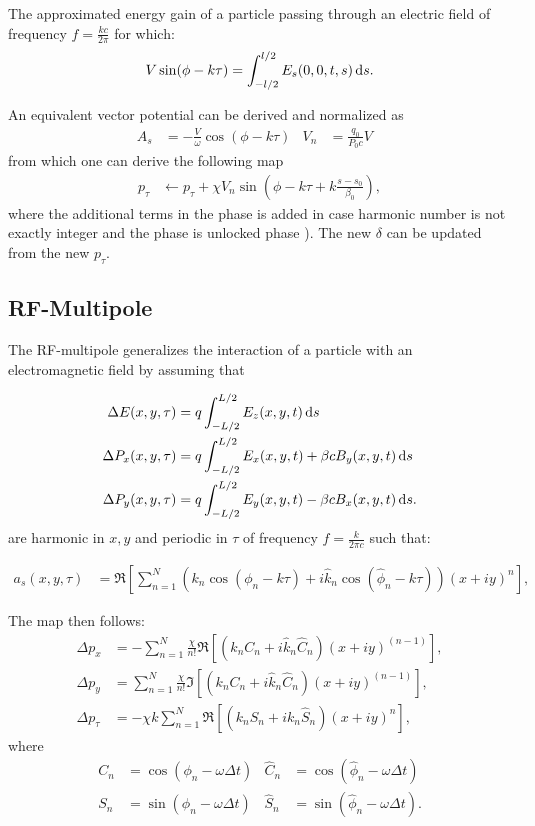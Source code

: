 The approximated energy gain of a particle passing through an electric field of frequency $f=\frac{kc}{2\pi}$ for which:
\begin{align}
V \sin(\phi - k \tau) = \int_{-l/2}^{l/2} E_s(0,0,t,s)  {\rm \,d}s.
\end{align}

An equivalent vector potential can be derived and normalized as
\begin{align}
A_s& = - \frac{V}{\omega} \cos(\phi - k \tau ) & 
V_n&=  \frac{q_0}{P_0 c} V  & 
\end{align}
from which one can derive the following map
\begin{align}
p_\tau & \leftarrow p_\tau + \chi V_n \sin(\phi - k \tau + k \frac{s-s_0}{\beta_0}  ),
\end{align}
where the additional terms in the phase is added in case harmonic number is not exactly
integer and the phase is unlocked phase ). The new $\delta$ can be updated from the new $p_\tau$.



\subsection{RF-Multipole}

The RF-multipole generalizes the interaction of a particle with an electromagnetic field by assuming that

\begin{align}
\Delta E(x,y,\tau) &= q \int_{-L/2}^{L/2} E_z(x,y,t)  {\rm \,d}s \\
\Delta P_x(x,y,\tau) &= q \int_{-L/2}^{L/2} E_x(x,y,t) + \beta c B_y(x,y,t) {\rm \,d}s\\
\Delta P_y(x,y,\tau) &= q \int_{-L/2}^{L/2} E_y(x,y,t) - \beta c B_x(x,y,t) {\rm \,d}s.
\end{align}
are harmonic in $x,y$ and periodic in $\tau$ of frequency $f=\frac{k}{2\pi c}$ such that:

\begin{align}
a_s(x,y,\tau) 
&= \Re \left[ \sum_{n=1}^N
      \left(       k_n \cos(\phi_n -k \tau ) +
            i \hat k_n \cos(\hat \phi_n -k \tau)
      \right)    
      (x+i y )^n
     \right],
\end{align}

The map then follows:
\begin{align}
    \Delta p_x &= -\sum_{n=1}^N \frac{\chi}{n!} \Re\left[ (k_n C_n + i \hat k_n \hat C_n)(x+iy)^{(n-1)}\right], \\
    \Delta p_y &=  \sum_{n=1}^N \frac{\chi}{n!} \Im\left[ (k_n C_n + i \hat k_n \hat C_n)(x+iy)^{(n-1)}\right], \\
    \Delta p_\tau &= -\chi k \sum_{n=1}^N \Re\left[( k_n S_n + i k_n \hat S_n ) (x+iy)^n\right],
\end{align}
where
\begin{align}
     C_n&=\cos(\phi_n-\omega \Delta t) &
\hat C_n&=\cos(\hat \phi_n-\omega \Delta t) \\
     S_n&=\sin(\phi_n-\omega \Delta t) &
\hat S_n&=\sin(\hat \phi_n-\omega \Delta t) .
\end{align}


